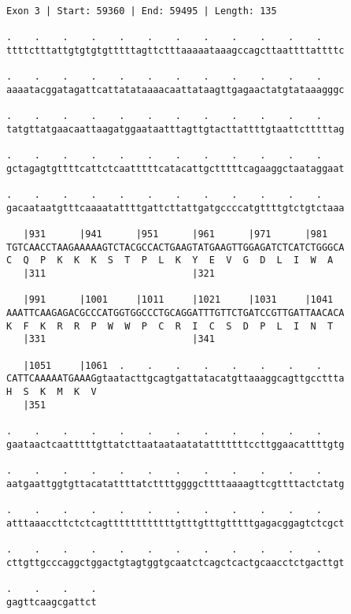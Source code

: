 \documentclass{article}
\begin{document}
\begin{Verbatim}[fontfamily=courier]
Exon 3 | Start: 59360 | End: 59495 | Length: 135

.    .    .    .    .    .    .    .    .    .    .    .    
ttttctttattgtgtgtgtttttagttctttaaaaataaagccagcttaattttattttc

.    .    .    .    .    .    .    .    .    .    .    .    
aaaatacggatagattcattatataaaacaattataagttgagaactatgtataaagggc

.    .    .    .    .    .    .    .    .    .    .    .    
tatgttatgaacaattaagatggaataatttagttgtacttattttgtaattctttttag

.    .    .    .    .    .    .    .    .    .    .    .    
gctagagtgttttcattctcaatttttcatacattgctttttcagaaggctaataggaat

.    .    .    .    .    .    .    .    .    .    .    .    
gacaataatgtttcaaaatattttgattcttattgatgccccatgttttgtctgtctaaa

   |931      |941      |951      |961      |971      |981   
TGTCAACCTAAGAAAAAGTCTACGCCACTGAAGTATGAAGTTGGAGATCTCATCTGGGCA
C  Q  P  K  K  K  S  T  P  L  K  Y  E  V  G  D  L  I  W  A  
   |311                          |321                       

   |991      |1001     |1011     |1021     |1031     |1041  
AAATTCAAGAGACGCCCATGGTGGCCCTGCAGGATTTGTTCTGATCCGTTGATTAACACA
K  F  K  R  R  P  W  W  P  C  R  I  C  S  D  P  L  I  N  T  
   |331                          |341                       

   |1051     |1061  .    .    .    .    .    .    .    .    
CATTCAAAAATGAAAGgtaatacttgcagtgattatacatgttaaaggcagttgccttta
H  S  K  M  K  V                                            
   |351                                                     

.    .    .    .    .    .    .    .    .    .    .    .    
gaataactcaatttttgttatcttaataataatatatttttttccttggaacattttgtg

.    .    .    .    .    .    .    .    .    .    .    .    
aatgaattggtgttacatattttatcttttggggcttttaaaagttcgttttactctatg

.    .    .    .    .    .    .    .    .    .    .    .    
atttaaaccttctctcagttttttttttttgtttgtttgtttttgagacggagtctcgct

.    .    .    .    .    .    .    .    .    .    .    .    
cttgttgcccaggctggactgtagtggtgcaatctcagctcactgcaacctctgacttgt

.    .    .    .
gagttcaagcgattct
\end{Verbatim}
\newpage
\end{document}
